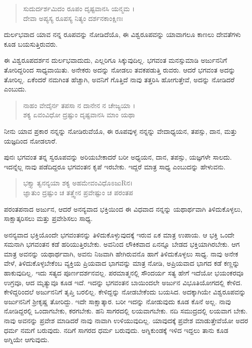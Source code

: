 \begin{verse}
ಸುದುರ್ದರ್ಶಮಿದಂ ರೂಪಂ ದೃಷ್ಟವಾನಸಿ ಯನ್ಮಮ ।\\ದೇವಾ ಅಪ್ಯಸ್ಯ ರೂಪಸ್ಯ ನಿತ್ಯಂ ದರ್ಶನಕಾಂಕ್ಷಿಣಃ 
\end{verse}

{\small ದುರ್ಲಭವಾದ ಯಾವ ನನ್ನ ರೂಪವನ್ನು ನೋಡಿದೆಯೊ, ಈ ವಿಶ್ವರೂಪವನ್ನು ಯಾವಾಗಲೂ ಕಾಣಲು ದೇವತೆಗಳು ಕೂಡ ಬಯಸುತ್ತಿರುವರು.}

ಈ ವಿಶ್ವರೂಪದರ್ಶನ ದುರ್ಲಭವಾದುದು, ಎಲ್ಲರಿಗೂ ಸಿಕ್ಕುವುದಿಲ್ಲ. ಭಗವಂತ ಮನಸ್ಸುಮಾಡಿ ಅರ್ಜುನನಿಗೆ ತೋರಿದ್ದರಿಂದ ಸಾಧ್ಯವಾಯಿತು. ಅನೇಕರು ಅದನ್ನು ನೋಡಲು ತವಕಪಡುತ್ತಿ ರುವರು. ಆದರೆ ಭಗವಂತ ಅದನ್ನು ತೋರಿಲ್ಲ. ಏಕೆಂದರೆ ನಮಗಿಂತ ಹೆಚ್ಚಾಗಿ, ಅವನಿಗೆ ಗೊತ್ತಿದೆ ನಾವು ತತ್ತರಿಸಿ ಹೋಗುತ್ತೇವೆ, ಅದನ್ನು ನೋಡಿದರೆ ಎಂಬುದು.

\begin{verse}
ನಾಹಂ ವೇದೈರ್ನ ತಪಸಾ ನ ದಾನೇನ ನ ಚೇಜ್ಯಯಾ ।\\ಶಕ್ಯ ಏವಂವಿಧೋ ದ್ರಷ್ಟುಂ ದೃಷ್ಟವಾನಸಿ ಮಾಂ ಯಥಾ 
\end{verse}

{\small ನೀನು ಯಾವ ಪ್ರಕಾರ ನನ್ನನ್ನು ನೋಡಿರುವೆಯೊ, ಈ ರೂಪವುಳ್ಳ ನನ್ನನ್ನು ವೇದಾಧ್ಯಯನ, ತಪಸ್ಸು, ದಾನ, ಮತ್ತು ಯಜ್ಞದಿಂದ ನೋಡಲಾರೆ.}

ಪುನಃ ಭಗವಂತ ತನ್ನ ಸ್ವರೂಪವನ್ನು ಅರಿಯಬೇಕಾದರೆ ಬರೀ ಅಧ್ಯಯನ, ದಾನ, ತಪಸ್ಸು, ಯಜ್ಞಗಳೇ ಸಾಲದು. ಇದನ್ನೆಲ್ಲ ನಾವು ಪಡೆದಿದ್ದರೂ ಭಗವಂತನ ಕೃಪೆ ಇರಬೇಕು. ಇದ್ದರೆ ಮಾತ್ರ ಸಾಧ್ಯ ಎಂಬುದನ್ನು ಹೇಳುವನು.

\begin{verse}
ಭಕ್ತ್ಯಾ ತ್ವನನ್ಯಯಾ ಶಕ್ಯ ಅಹಮೇವಂವಿಧೊಽಜುRನ।\\ಜ್ಞಾತುಂ ದ್ರಷ್ಟುಂ ಚ ತತ್ತ್ವೇನ ಪ್ರವೇಷ್ಟುಂ ಚ ಪರಂತಪ 
\end{verse}

{\small ಪರಂತಪನಾದ ಅರ್ಜುನ, ಆದರೆ ಅನನ್ಯವಾದ ಭಕ್ತಿಯಿಂದ ಈ ವಿಧವಾದ ನನ್ನನ್ನು ಯಥಾರ್ಥವಾಗಿ ತಿಳಿದುಕೊಳ್ಳಲು, ಸಾಕ್ಷಾತ್ಕರಿಸಲು ಮತ್ತು ಪ್ರವೇಶಿಸಲು ಸಾಧ್ಯ.}

ಅನನ್ಯವಾದ ಭಕ್ತಿಯೊಂದೇ ಭಗವಂತನನ್ನು ತಿಳಿದುಕೊಳ್ಳುವುದಕ್ಕೆ ಇರುವ ಏಕ ಮಾತ್ರ ಉಪಾಯ. ಆ ಭಕ್ತಿ ಒಂದೇ ಸಮನಾಗಿ ಭಗವಂತನ ಕಡೆ ಹರಿಯುತ್ತಿರಬೇಕು. ಅವನಿಂದ ಲೌಕಿಕವಾದ ಏನನ್ನೂ ಬೇಡದ ಭಕ್ತಿಯಾಗಿರಬೇಕು. ಆಗ ಮಾತ್ರ ಅವನನ್ನು ಯಥಾರ್ಥವಾಗಿ, ಅವನು ನಿಜವಾಗಿ ಹೇಗಿರುವನೊ ಹಾಗೆ ತಿಳಿದುಕೊಳ್ಳಲು ಸಾಧ್ಯ. ನಾವು ಅನೇಕ ವೇಳೆ, ತಿಳಿದುಕೊಳ್ಳಬೇಕೆಂಬ ವ್ಯಕ್ತಿಯ ಪ್ರಿಯವಾದ ಭಾಗವನ್ನು ಮಾತ್ರ ನೋಡಿ, ಅಪ್ರಿಯವಾದ ಭಾಗದ ಕಡೆ ಕಣ್ಣನ್ನು ಹಾಕುವುದಿಲ್ಲ. ಇದು ಸತ್ಯದ ಪೂರ್ಣದರ್ಶನವಲ್ಲ. ಪರಮಾತ್ಮನಲ್ಲಿ ಸೌಂದರ್ಯ ಸತ್ಯ ಹೇಗೆ ಇದೆಯೋ ಭಯಂಕರವೂ ಉಗ್ರವೂ, ಆದ ಮೃತ್ಯುವೂ ಕೂಡ ಇದೆ. ಇದನ್ನು ಭಗವಂತನ ಬಾಯಿಂದಲೇ ಅರ್ಜುನ ವಿಭೂತಿಯೋಗದಲ್ಲಿ ಕೇಳಿದ. ಕೇಳಿದ್ದರಿಂದಲೆ ಅರ್ಜುನನಿಗೆ ತೃಪ್ತಿ ಬರಲಿಲ್ಲ. ಕೇಳಿದ್ದನ್ನು ನೋಡಬೇಕೆಂದು ಬಯಸಿದ. ಅದಕ್ಕಾಗಿಯೇ ವಿಶ್ವರೂಪವನ್ನು ಅರ್ಜುನನಿಗೆ ಶ್ರೀಕೃಷ್ಣ ತೋರಿದ್ದು. ಇದೇ ಸಾಕ್ಷಾತ್ಕಾರ. ಬರೀ ಇದನ್ನು ನೋಡುವುದು ಕೂಡ ಕೊನೆ ಅಲ್ಲ. ನಾವು ನೋಡಿದ್ದರಲ್ಲಿ ಒಂದಾಗಬೇಕು, ಕರಗಬೇಕು. ಹನಿ ಸಾಗರದಲ್ಲಿ ಲಯವಾಗಬೇಕು. ನದಿ ಸಮುದ್ರದಲ್ಲಿ ಲಯವಾಗ ಬೇಕು. ನಾವು ಅವನನ್ನು ಪ್ರವೇಶ ಮಾಡಿದರೆ ನಾವು ನಾವಾಗಿ ಉಳಿಯುವುದಿಲ್ಲ. ಯಾವುದಕ್ಕೆ ಪ್ರವೇಶ ಮಾಡುತ್ತೇವೆಯೋ ಅದರ ಧರ್ಮ ನಮಗೆ ಬರುವುದು. ನದಿಗೆ ಸಾಗರದ ಧರ್ಮ ಬರುವುದು. ಅಗ್ನಿಕುಂಡಕ್ಕೆ ಇಳಿದ ಇದ್ದಲು ತಾನು ಕೂಡ ಅಗ್ನಿಯೇ ಆಗುವುದು.

